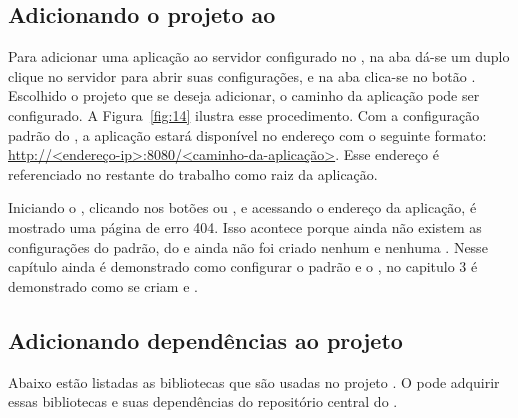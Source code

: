 \subsection{Adicionando o projeto ao }

Para adicionar uma aplicação  ao servidor  configurado no , na aba  dá-se um duplo clique no servidor para abrir suas configurações, e na aba  clica-se no botão . Escolhido o projeto  que se deseja adicionar, o caminho da aplicação pode ser configurado. A Figura~\ref{fig:14} ilustra esse procedimento. Com a configuração padrão do , a aplicação estará disponível no endereço com o seguinte formato: \url{http://<endereço-ip>:8080/<caminho-da-aplicação>}. Esse endereço é referenciado no restante do trabalho como raiz da aplicação.

Iniciando o , clicando nos botões  ou , e acessando o endereço da aplicação, é mostrado uma página de erro 404. Isso acontece porque ainda não existem as configurações do  padrão, do  e ainda não foi criado nenhum  e nenhuma . Nesse capítulo ainda é demonstrado como configurar o  padrão e o , no capitulo 3 é demonstrado como se criam  e .


\subsection{Adicionando dependências ao projeto}

Abaixo estão listadas as bibliotecas que são usadas no projeto \spring. O  pode adquirir essas bibliotecas e suas dependências do repositório central do .


